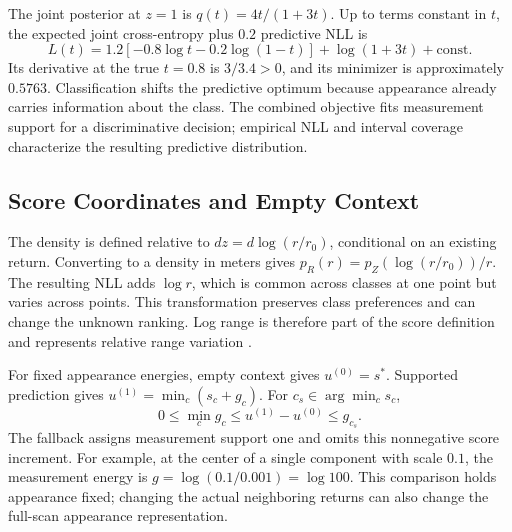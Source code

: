 \documentclass{article}
\begin{document}
The joint posterior at $z=1$ is $q(t)=4t/(1+3t)$. Up to terms constant in $t$, the expected joint cross-entropy plus $0.2$ predictive NLL is
\begin{equation}
 L(t)=1.2[-0.8\log t-0.2\log(1-t)]+\log(1+3t)+\mathrm{const}.
\end{equation}
Its derivative at the true $t=0.8$ is $3/3.4>0$, and its minimizer is approximately $0.5763$. Classification shifts the predictive optimum because appearance already carries information about the class. The combined objective fits measurement support for a discriminative decision; empirical NLL and interval coverage characterize the resulting predictive distribution.

\subsection{Score Coordinates and Empty Context}
\label{app:context-scale}
The density is defined relative to $dz=d\log(r/r_0)$, conditional on an existing return. Converting to a density in meters gives $p_R(r)=p_Z(\log(r/r_0))/r$. The resulting NLL adds $\log r$, which is common across classes at one point but varies across points. This transformation preserves class preferences and can change the unknown ranking. Log range is therefore part of the score definition and represents relative range variation \citep{perfectdensity}.

For fixed appearance energies, empty context gives $u^{(0)}=s^*$. Supported prediction gives $u^{(1)}=\min_c(s_c+g_c)$. For $c_s\in\arg\min_c s_c$,
\begin{equation}
 0\leq\min_c g_c\leq u^{(1)}-u^{(0)}\leq g_{c_s}.
 \label{eq:context-gap}
\end{equation}
The fallback assigns measurement support one and omits this nonnegative score increment. For example, at the center of a single component with scale $0.1$, the measurement energy is $g=\log(0.1/0.001)=\log100$. This comparison holds appearance fixed; changing the actual neighboring returns can also change the full-scan appearance representation.
\end{document}
